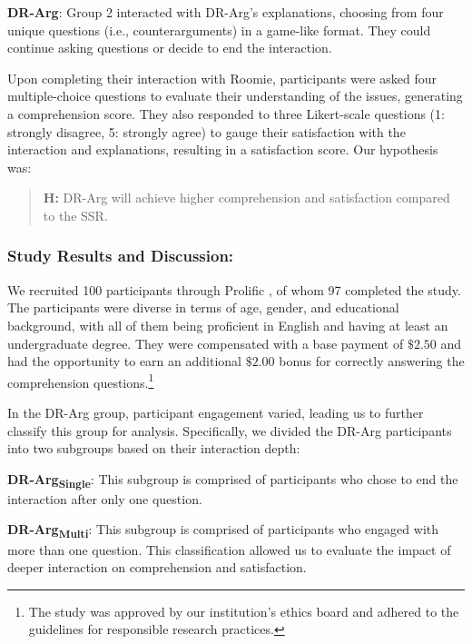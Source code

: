 \documentclass{article}
\begin{document}
    \item \textbf{DR-Arg}: Group 2 interacted with DR-Arg's explanations, choosing from four unique questions (i.e., counterarguments) in a game-like format. They could continue asking questions or decide to end the interaction.

\squishend

Upon completing their interaction with Roomie, participants were asked four multiple-choice questions to evaluate their understanding of the issues, generating a comprehension score. They also responded to three Likert-scale questions (1: strongly disagree, 5: strongly agree) to gauge their satisfaction with the interaction and explanations, resulting in a satisfaction score. Our hypothesis was:



\begin{quote}
\textbf{H:} DR-Arg will achieve higher comprehension and satisfaction 
compared to the SSR.
\end{quote}












\subsubsection{Study Results and Discussion:}
We recruited 100 participants through Prolific \citep{palan2018prolific}, of whom 97 completed the study. The participants were diverse in terms of age, gender, and educational background, with all of them being proficient in English and having at least an undergraduate degree. They were compensated with a base payment of $\$2.50$ and had the opportunity to earn an additional $\$2.00$ bonus for correctly answering the comprehension questions.\footnote{The study was approved by our institution's ethics board and adhered to the guidelines for responsible research practices.}


In the DR-Arg group, participant engagement varied, leading us to further classify this group for analysis. Specifically, we divided the DR-Arg participants into two subgroups based on their interaction depth:
\squishlist
    \item \textbf{DR-Arg\textsubscript{Single}}: This subgroup is comprised of participants who chose to end the interaction after only one question. 
    \item \textbf{DR-Arg\textsubscript{Multi}}: This subgroup is comprised of participants who engaged with more than one question. 
\squishend
This classification allowed us to evaluate the impact of deeper interaction on comprehension and satisfaction.
\end{document}
